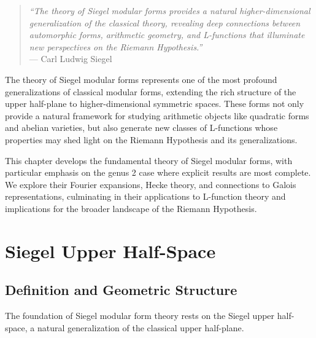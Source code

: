 

\begin{quote}
\textit{``The theory of Siegel modular forms provides a natural higher-dimensional generalization of the classical theory, revealing deep connections between automorphic forms, arithmetic geometry, and L-functions that illuminate new perspectives on the Riemann Hypothesis.''} \\
--- Carl Ludwig Siegel
\end{quote}

The theory of Siegel modular forms represents one of the most profound generalizations of classical modular forms, extending the rich structure of the upper half-plane to higher-dimensional symmetric spaces. These forms not only provide a natural framework for studying arithmetic objects like quadratic forms and abelian varieties, but also generate new classes of L-functions whose properties may shed light on the Riemann Hypothesis and its generalizations.

This chapter develops the fundamental theory of Siegel modular forms, with particular emphasis on the genus 2 case where explicit results are most complete. We explore their Fourier expansions, Hecke theory, and connections to Galois representations, culminating in their applications to L-function theory and implications for the broader landscape of the Riemann Hypothesis.

\section{Siegel Upper Half-Space}
\label{sec:siegel_space}

\subsection{Definition and Geometric Structure}

The foundation of Siegel modular form theory rests on the Siegel upper half-space, a natural generalization of the classical upper half-plane.

